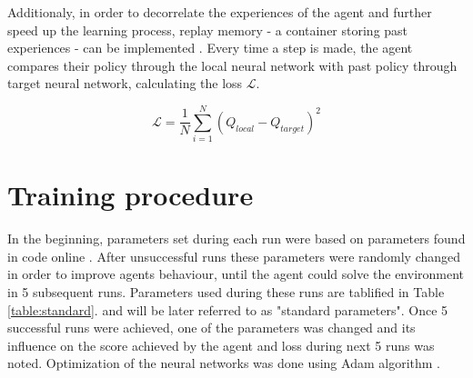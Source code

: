 \documentclass{article}
\begin{document}
Additionaly, in order to decorrelate the experiences of the agent and further speed up the learning process, replay memory - a container storing past experiences - can be implemented \cite{liu2018effects}. Every time a step is made, the agent compares their policy through the local neural network with past policy through target neural network, calculating the loss $\mathcal{L}$.

\begin{equation}
    \mathcal{L} = \frac{1}{N}\sum^{N}_{i=1}{(Q_{local}-Q_{target})^2}
\end{equation}

\section{Training procedure}
In the beginning, parameters set during each run were based on parameters found in code online \footnotemark. After unsuccessful runs these parameters were randomly changed in order to improve agents behaviour, until the agent could solve the environment in 5 subsequent runs. Parameters used during these runs are tablified in Table \ref{table:standard}. and will be later referred to as "standard parameters". Once 5 successful runs were achieved, one of the parameters was changed and its influence on the score achieved by the agent and loss during next 5 runs was noted. Optimization of the neural networks was done using Adam algorithm \cite{kingma2014adam}.
\end{document}
